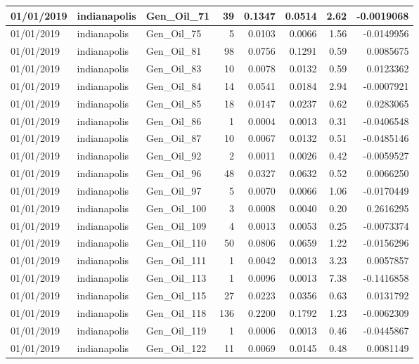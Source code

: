 \documentclass[
  letterpaper,
  DIV=11,
  numbers=noendperiod]{scrartcl}
\begin{document}
\begin{tabular}{l|l|l|r|r|r|r|r}
\hline
01/01/2019 & indianapolis & Gen\_Oil\_71 & 39 & 0.1347 & 0.0514 & 2.62 & -0.0019068\\
\hline
01/01/2019 & indianapolis & Gen\_Oil\_75 & 5 & 0.0103 & 0.0066 & 1.56 & -0.0149956\\
\hline
01/01/2019 & indianapolis & Gen\_Oil\_81 & 98 & 0.0756 & 0.1291 & 0.59 & 0.0085675\\
\hline
01/01/2019 & indianapolis & Gen\_Oil\_83 & 10 & 0.0078 & 0.0132 & 0.59 & 0.0123362\\
\hline
01/01/2019 & indianapolis & Gen\_Oil\_84 & 14 & 0.0541 & 0.0184 & 2.94 & -0.0007921\\
\hline
01/01/2019 & indianapolis & Gen\_Oil\_85 & 18 & 0.0147 & 0.0237 & 0.62 & 0.0283065\\
\hline
01/01/2019 & indianapolis & Gen\_Oil\_86 & 1 & 0.0004 & 0.0013 & 0.31 & -0.0406548\\
\hline
01/01/2019 & indianapolis & Gen\_Oil\_87 & 10 & 0.0067 & 0.0132 & 0.51 & -0.0485146\\
\hline
01/01/2019 & indianapolis & Gen\_Oil\_92 & 2 & 0.0011 & 0.0026 & 0.42 & -0.0059527\\
\hline
01/01/2019 & indianapolis & Gen\_Oil\_96 & 48 & 0.0327 & 0.0632 & 0.52 & 0.0066250\\
\hline
01/01/2019 & indianapolis & Gen\_Oil\_97 & 5 & 0.0070 & 0.0066 & 1.06 & -0.0170449\\
\hline
01/01/2019 & indianapolis & Gen\_Oil\_100 & 3 & 0.0008 & 0.0040 & 0.20 & 0.2616295\\
\hline
01/01/2019 & indianapolis & Gen\_Oil\_109 & 4 & 0.0013 & 0.0053 & 0.25 & -0.0073374\\
\hline
01/01/2019 & indianapolis & Gen\_Oil\_110 & 50 & 0.0806 & 0.0659 & 1.22 & -0.0156296\\
\hline
01/01/2019 & indianapolis & Gen\_Oil\_111 & 1 & 0.0042 & 0.0013 & 3.23 & 0.0057857\\
\hline
01/01/2019 & indianapolis & Gen\_Oil\_113 & 1 & 0.0096 & 0.0013 & 7.38 & -0.1416858\\
\hline
01/01/2019 & indianapolis & Gen\_Oil\_115 & 27 & 0.0223 & 0.0356 & 0.63 & 0.0131792\\
\hline
01/01/2019 & indianapolis & Gen\_Oil\_118 & 136 & 0.2200 & 0.1792 & 1.23 & -0.0062309\\
\hline
01/01/2019 & indianapolis & Gen\_Oil\_119 & 1 & 0.0006 & 0.0013 & 0.46 & -0.0445867\\
\hline
01/01/2019 & indianapolis & Gen\_Oil\_122 & 11 & 0.0069 & 0.0145 & 0.48 & 0.0081149\\

\end{tabular}
\end{document}
